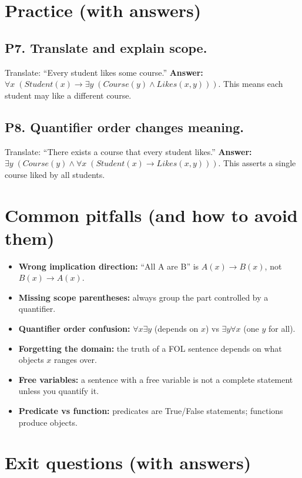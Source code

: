 \documentclass[11pt]{article}
\begin{document}
\section{Practice (with answers)}

\subsection*{P7. Translate and explain scope.}
Translate: ``Every student likes some course.''
\textbf{Answer:} $\forall x\; (Student(x) \rightarrow \exists y\; (Course(y)\land Likes(x,y)))$.
This means each student may like a different course.

\subsection*{P8. Quantifier order changes meaning.}
Translate: ``There exists a course that every student likes.''
\textbf{Answer:} $\exists y\; (Course(y) \land \forall x\; (Student(x)\rightarrow Likes(x,y)))$.
This asserts a single course liked by all students.

\section{Common pitfalls (and how to avoid them)}
\begin{itemize}[leftmargin=*]
  \item \textbf{Wrong implication direction:} ``All A are B'' is $A(x)\rightarrow B(x)$, not $B(x)\rightarrow A(x)$.
  \item \textbf{Missing scope parentheses:} always group the part controlled by a quantifier.
  \item \textbf{Quantifier order confusion:} $\forall x\exists y$ (depends on $x$) vs $\exists y\forall x$ (one $y$ for all).
  \item \textbf{Forgetting the domain:} the truth of a FOL sentence depends on what objects $x$ ranges over.
  \item \textbf{Free variables:} a sentence with a free variable is not a complete statement unless you quantify it.
  \item \textbf{Predicate vs function:} predicates are True/False statements; functions produce objects.
\end{itemize}

\section{Exit questions (with answers)}
\end{document}
